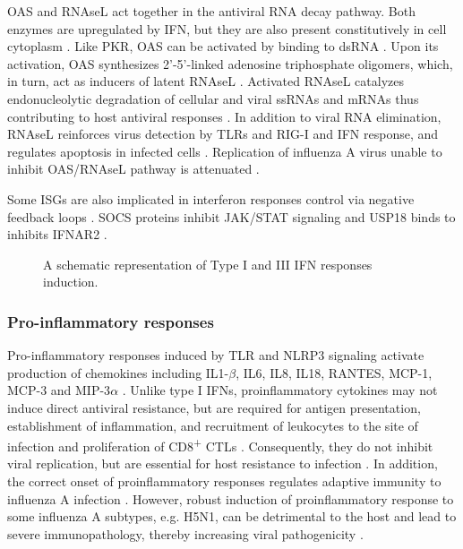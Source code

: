 		\gls{OAS} and \gls{RNAseL} act together in the antiviral RNA decay pathway. Both enzymes are upregulated by \gls{IFN}, but they are also present constitutively in cell cytoplasm \parencite{Sadler2008}. Like \gls{PKR}, \gls{OAS} can be activated by binding to dsRNA \parencite{Castelli1998}. Upon its activation, \gls{OAS} synthesizes 2'-5'-linked adenosine triphosphate oligomers, which, in turn, act as inducers of latent \gls{RNAseL} \parencite{Rebouillat1999}. Activated \gls{RNAseL} catalyzes endonucleolytic degradation of cellular and viral ssRNAs and mRNAs thus contributing to host antiviral responses \parencite{Dyer2006}. In addition to viral RNA elimination, \gls{RNAseL} reinforces virus detection by \gls{TLR}s and \gls{RIG-I} and \gls{IFN} response, and regulates apoptosis in infected cells \parencite{Liang2006}. Replication of influenza A virus unable to inhibit \gls{OAS}/\gls{RNAseL} pathway is attenuated \parencite{Min2006}.
		
		Some \gls{ISG}s are also implicated in interferon responses control via negative feedback loops \parencite{Schneider2014}. SOCS proteins inhibit JAK/STAT signaling \parencite{Hong2013} and USP18 binds to inhibits IFNAR2  \parencite{Ritchie2004}.
		
		\begin{figure} %
			\centering
			\caption{A schematic representation of Type I and III \gls{IFN} responses induction.} \label{fig:IFN}
		\end{figure}
		
		
		\subsubsection{Pro-inflammatory responses}
		
		Pro-inflammatory responses induced by \gls{TLR} and \gls{NLRP3} signaling activate production of chemokines including IL1-$\beta$, IL6, IL8, IL18, RANTES, MCP-1, MCP-3 and MIP-3$\alpha$ \parencite{Julkunen2000, LeGoffic2007}. Unlike type I \glspl{IFN}, proinflammatory cytokines may not induce direct antiviral resistance, but are required for antigen presentation, establishment of inflammation, and recruitment of leukocytes to the site of infection and proliferation of CD8\textsuperscript{+} \glspl{CTL} \parencite{VanDerSluijs2005, Schulz2005, LeGoffic2006}. Consequently, they do not inhibit viral replication, but are essential for host resistance to infection \parencite{Pang2013}. In addition, the correct onset of proinflammatory responses regulates adaptive immunity to influenza A infection \parencite{Trinchieri2003, Ichinohe2009}. However, robust induction of proinflammatory response to some influenza A subtypes, e.g. H5N1, can be detrimental to the host and lead to severe immunopathology, thereby increasing viral pathogenicity \parencite{LaGruta2007}.	
			

